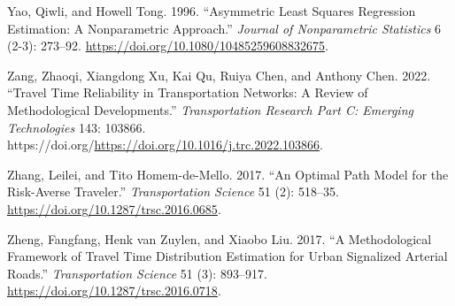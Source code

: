 \documentclass[
]{article}
\newlength{\cslhangindent}
\newlength{\cslentryspacingunit} %
\newenvironment{CSLReferences}[2] %
 {%
  \setlength{\parindent}{0pt}
  \ifodd #1
  \let\oldpar\par
  \def\par{\hangindent=\cslhangindent\oldpar}
  \fi
  \setlength{\parskip}{#2\cslentryspacingunit}
 }%
 {}
\theoremstyle{definition}
\theoremstyle{definition}
\theoremstyle{definition}
\theoremstyle{definition}
\theoremstyle{remark}
\begin{document}
\begin{CSLReferences}{1}{0}
\leavevmode{}%
Yao, Qiwli, and Howell Tong. 1996. {``Asymmetric Least Squares Regression Estimation: A Nonparametric Approach.''} \emph{Journal of Nonparametric Statistics} 6 (2-3): 273--92. \url{https://doi.org/10.1080/10485259608832675}.

\leavevmode{}%
Zang, Zhaoqi, Xiangdong Xu, Kai Qu, Ruiya Chen, and Anthony Chen. 2022. {``Travel Time Reliability in Transportation Networks: A Review of Methodological Developments.''} \emph{Transportation Research Part C: Emerging Technologies} 143: 103866. https://doi.org/\url{https://doi.org/10.1016/j.trc.2022.103866}.

\leavevmode{}%
Zhang, Leilei, and Tito Homem-de-Mello. 2017. {``An Optimal Path Model for the Risk-Averse Traveler.''} \emph{Transportation Science} 51 (2): 518--35. \url{https://doi.org/10.1287/trsc.2016.0685}.

\leavevmode{}%
Zheng, Fangfang, Henk van Zuylen, and Xiaobo Liu. 2017. {``A Methodological Framework of Travel Time Distribution Estimation for Urban Signalized Arterial Roads.''} \emph{Transportation Science} 51 (3): 893--917. \url{https://doi.org/10.1287/trsc.2016.0718}.

\end{CSLReferences}
\end{document}
